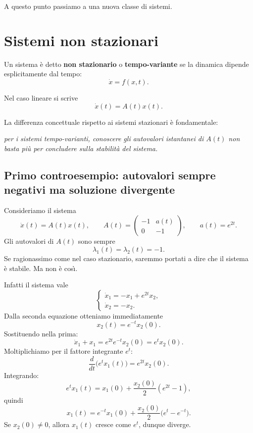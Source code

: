 \medskip

\noindent
A questo punto passiamo a una nuova classe di sistemi.

\section{Sistemi non stazionari}

Un sistema \`e detto \textbf{non stazionario} o \textbf{tempo-variante} se la dinamica dipende esplicitamente dal tempo:
\begin{equation}
\label{eq:L25-nonstat}
\dot x = f(x,t).
\end{equation}

Nel caso lineare si scrive
\begin{equation}
\label{eq:L25-ltv}
\dot x(t)=A(t)x(t).
\end{equation}

La differenza concettuale rispetto ai sistemi stazionari \`e fondamentale:
\begin{center}
\emph{per i sistemi tempo-varianti, conoscere gli autovalori istantanei di \(A(t)\) non basta pi\`u per concludere sulla stabilit\`a del sistema.}
\end{center}

\subsection{Primo controesempio: autovalori sempre negativi ma soluzione divergente}

Consideriamo il sistema
\[
\dot x(t)=A(t)x(t),
\qquad
A(t)=
\begin{pmatrix}
-1 & a(t)\\
0 & -1
\end{pmatrix},
\qquad
a(t)=e^{2t}.
\]
Gli autovalori di \(A(t)\) sono sempre
\[
\lambda_1(t)=\lambda_2(t)=-1.
\]
Se ragionassimo come nel caso stazionario, saremmo portati a dire che il sistema \`e stabile. Ma non \`e cos\`\i.

Infatti il sistema vale
\[
\begin{cases}
\dot x_1 = -x_1 + e^{2t}x_2,\\[4pt]
\dot x_2 = -x_2.
\end{cases}
\]
Dalla seconda equazione otteniamo immediatamente
\[
x_2(t)=e^{-t}x_2(0).
\]
Sostituendo nella prima:
\[
\dot x_1 + x_1 = e^{2t}e^{-t}x_2(0)=e^t x_2(0).
\]
Moltiplichiamo per il fattore integrante \(e^t\):
\[
\frac{d}{dt}\bigl(e^t x_1(t)\bigr)=e^{2t}x_2(0).
\]
Integrando:
\[
e^t x_1(t)=x_1(0)+\frac{x_2(0)}{2}(e^{2t}-1),
\]
quindi
\[
x_1(t)=e^{-t}x_1(0)+\frac{x_2(0)}{2}\bigl(e^t-e^{-t}\bigr).
\]
Se \(x_2(0)\neq 0\), allora \(x_1(t)\) cresce come \(e^t\), dunque diverge.

